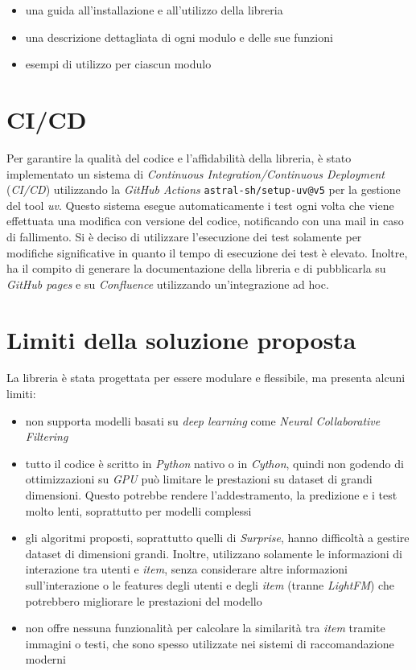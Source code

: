 \begin{itemize}
    \item una guida all'installazione e all'utilizzo della libreria
    \item una descrizione dettagliata di ogni modulo e delle sue funzioni
    \item esempi di utilizzo per ciascun modulo
\end{itemize}

\section{CI/CD}

Per garantire la qualità del codice e l'affidabilità della libreria, è stato implementato un sistema di \textit{Continuous Integration/Continuous Deployment} (\textit{CI/CD}) utilizzando la \textit{GitHub Actions} \texttt{astral-sh/setup-uv@v5} per la gestione del tool \textit{uv}. Questo sistema esegue automaticamente i test ogni volta che viene effettuata una modifica con versione del codice, notificando con una mail in caso di fallimento. Si è deciso di utilizzare l'esecuzione dei test solamente per modifiche significative in quanto il tempo di esecuzione dei test è elevato. Inoltre, ha il compito di generare la documentazione della libreria e di pubblicarla su \textit{GitHub pages} e su \textit{Confluence} utilizzando un'integrazione ad hoc.

\section{Limiti della soluzione proposta}

La libreria è stata progettata per essere modulare e flessibile, ma presenta alcuni limiti:

\begin{itemize}
    \item non supporta modelli basati su \textit{deep learning} come \textit{Neural Collaborative Filtering}
    \item tutto il codice è scritto in \textit{Python} nativo o in \textit{Cython}, quindi non godendo di ottimizzazioni su \textit{GPU} può limitare le prestazioni su dataset di grandi dimensioni. Questo potrebbe rendere l'addestramento, la predizione e i test molto lenti, soprattutto per modelli complessi
    \item gli algoritmi proposti, soprattutto quelli di \textit{Surprise}, hanno difficoltà a gestire dataset di dimensioni grandi. Inoltre, utilizzano solamente le informazioni di interazione tra utenti e \textit{item}, senza considerare altre informazioni sull'interazione o le features degli utenti e degli \textit{item} (tranne \textit{LightFM}) che potrebbero migliorare le prestazioni del modello
    \item non offre nessuna funzionalità per calcolare la similarità tra \textit{item} tramite immagini o testi, che sono spesso utilizzate nei sistemi di raccomandazione moderni    
\end{itemize}



